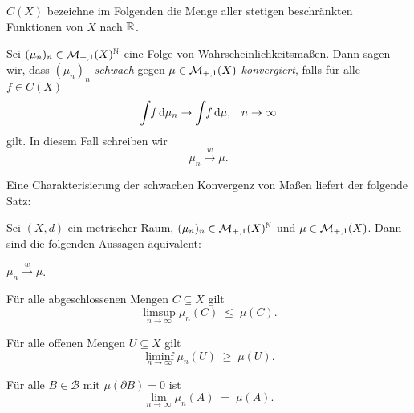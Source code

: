 \documentclass[../main/main.tex]{subfiles}
\begin{document}
	 $C(X)$ bezeichne im Folgenden die Menge aller stetigen beschränkten Funktionen von $X$ nach $\mathbb{R}$.

	\begin{Definition}
		Sei $(\mu_n)_n \in \mathcal{M}_{+,1}(X)^{\mathbb{N}}$ eine Folge von Wahrscheinlichkeitsmaßen.
		Dann sagen wir, dass $(\mu_n)_n$ 
		\emph{schwach} gegen $\mu \in \mathcal{M}_{+,1}(X)$ \emph{konvergiert}, falls für alle $f \in C(X)$
		$$\int_{} \, f \, \mathrm{d}\mu_n \to \int_{} \, f \, \mathrm{d}\mu\text{,} \quad n \to \infty $$
		gilt. In diesem Fall schreiben wir
		$$\mu_n \xrightarrow{w} \mu \text{.}$$
	\end{Definition}

	Eine Charakterisierung der schwachen Konvergenz von Maßen liefert der folgende Satz:

	\begin{Satz}[Portmanteau]
		Sei $(X, d)$ ein metrischer Raum, $(\mu_n)_n \in \mathcal{M}_{+,1}(X)^{\mathbb{N}}$ 
		und $\mu \in \mathcal{M}_{+,1}(X)$. Dann sind die folgenden Aussagen äquivalent:
		\begin{equivalentthm}
			\item $\mu_n \xrightarrow{w} \mu$.
			\item Für alle abgeschlossenen Mengen $C \subseteq X$ gilt 
				$$\limsup_{n \to \infty} \mu_n(C) \; \leq \; \mu(C) \text{.}$$
			\item Für alle offenen Mengen $U \subseteq X$ gilt 
				$$\liminf_{n \to \infty} \mu_n(U) \; \geq \; \mu(U) \text{.}$$
			\item Für alle $B \in \mathcal{B}$ mit $\mu(\partial B) = 0$ 
				ist $$\lim_{n \to \infty} \mu_n(A) \; = \; \mu(A) \text{.}$$
		\end{equivalentthm}
	\end{Satz}
\end{document}
